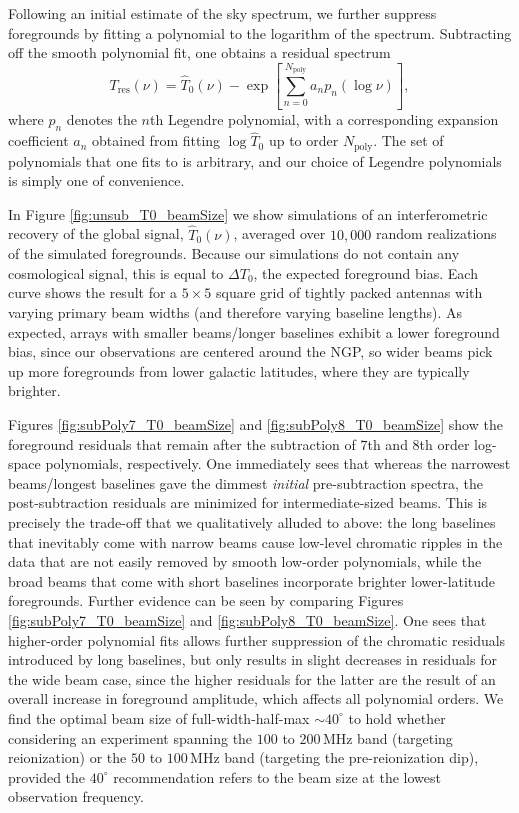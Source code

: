 \documentclass[twocolumn,apj,numberedappendix]{emulateapj}
\begin{document}
Following an initial estimate of the sky spectrum, we further suppress foregrounds by fitting a polynomial to the logarithm of the spectrum. Subtracting off the smooth polynomial fit, one obtains a residual spectrum
\begin{equation}
\label{eq:FgFit}
T_\textrm{res} (\nu) = \widehat{T}_0(\nu) -  \exp \left[ \sum_{n=0}^{N_\textrm{poly}} a_n p_n( \log \nu) \right],
\end{equation}
where $p_n$ denotes the $n$th Legendre polynomial, with a corresponding expansion coefficient $a_n$ obtained from fitting $\log \widehat{T}_0$ up to order $N_\textrm{poly}$. The set of polynomials that one fits to is arbitrary, and our choice of Legendre polynomials is simply one of convenience.

In Figure \ref{fig:unsub_T0_beamSize} we show simulations of an interferometric recovery of the global signal, $\widehat{T}_0 (\nu)$, averaged over $10,000$ random realizations of the simulated foregrounds. Because our simulations do not contain any cosmological signal, this is equal to $\Delta T_0$, the expected foreground bias. Each curve shows the result for a $5\times5$ square grid of tightly packed antennas with varying primary beam widths (and therefore varying baseline lengths). As expected, arrays with smaller beams/longer baselines exhibit a lower foreground bias, since our observations are centered around the NGP, so wider beams pick up more foregrounds from lower galactic latitudes, where they are typically brighter.

Figures \ref{fig:subPoly7_T0_beamSize} and \ref{fig:subPoly8_T0_beamSize} show the foreground residuals that remain after the subtraction of $7$th and $8$th order log-space polynomials, respectively. One immediately sees that whereas the narrowest beams/longest baselines gave the dimmest \emph{initial} pre-subtraction spectra, the post-subtraction residuals are minimized for intermediate-sized beams. This is precisely the trade-off that we qualitatively alluded to above: the long baselines that inevitably come with narrow beams cause low-level chromatic ripples in the data that are not easily removed by smooth low-order polynomials, while the broad beams that come with short baselines incorporate brighter lower-latitude foregrounds. Further evidence can be seen by comparing Figures \ref{fig:subPoly7_T0_beamSize} and \ref{fig:subPoly8_T0_beamSize}. One sees that higher-order polynomial fits allows further suppression of the chromatic residuals introduced by long baselines, but only results in slight decreases in residuals for the wide beam case, since the higher residuals for the latter are the result of an overall increase in foreground amplitude, which affects all polynomial orders. We find the optimal beam size of full-width-half-max $ \sim 40^\circ$ to hold whether considering an experiment spanning the $100$ to $200\,\textrm{MHz}$ band (targeting reionization) or the $50$ to $100\,\textrm{MHz}$ band (targeting the pre-reionization dip), provided the $ 40^\circ$ recommendation refers to the beam size at the lowest observation frequency.
\end{document}

